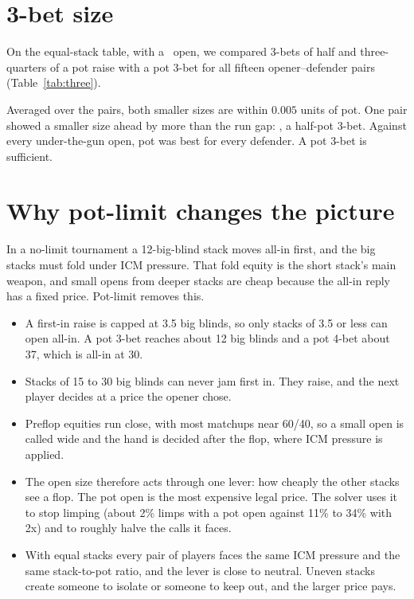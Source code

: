 \documentclass[10pt]{article}
\begin{document}
\section{3-bet size}
On the equal-stack table, with a \ThreeOpen\ open, we compared 3-bets of half and three-quarters of a
pot raise with a pot 3-bet for all fifteen opener--defender pairs (Table~\ref{tab:three}).

\begin{table}[H]
\centering\small
\caption{3-bet size, equal stacks: value of the player facing one open relative to a pot 3-bet,
over fifteen opener--defender pairs.}
\label{tab:three}

\end{table}

Averaged over the pairs, both smaller sizes are within $0.005$ units of pot. One pair showed a
smaller size ahead by more than the run gap: \ThreeHalfBeyond, a half-pot 3-bet. Against every
under-the-gun open, pot was best for every defender. A pot 3-bet is sufficient.

\section{Why pot-limit changes the picture}
In a no-limit tournament a 12-big-blind stack moves all-in first, and the big stacks must fold under
ICM pressure. That fold equity is the short stack's main weapon, and small opens from deeper stacks
are cheap because the all-in reply has a fixed price. Pot-limit removes this.
\begin{itemize}
\item A first-in raise is capped at 3.5 big blinds, so only stacks of 3.5 or less can open all-in.
A pot 3-bet reaches about 12 big blinds and a pot 4-bet about 37, which is all-in at 30.
\item Stacks of 15 to 30 big blinds can never jam first in. They raise, and the next player decides
at a price the opener chose.
\item Preflop equities run close, with most matchups near 60/40, so a small open is called wide and
the hand is decided after the flop, where ICM pressure is applied.
\item The open size therefore acts through one lever: how cheaply the other stacks see a flop. The
pot open is the most expensive legal price. The solver uses it to stop limping (about 2\% limps with a
pot open against 11\% to 34\% with 2x) and to roughly halve the calls it faces.
\item With equal stacks every pair of players faces the same ICM pressure and the same stack-to-pot
ratio, and the lever is close to neutral. Uneven stacks create someone to isolate or someone to keep
out, and the larger price pays.
\end{itemize}
\end{document}
